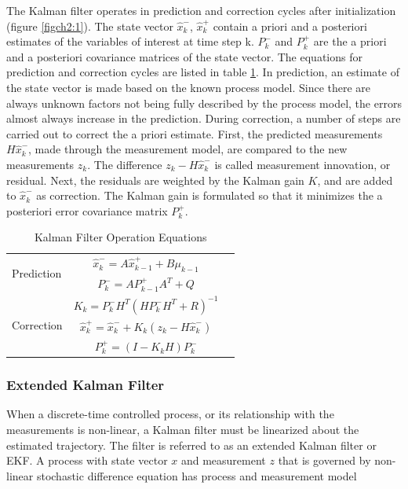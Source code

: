 The Kalman filter operates in prediction and correction cycles after
initialization (figure \ref{figch2:1}). The state vector
$\hat{x}^-_k$, $\hat{x}^+_k$ contain a priori and a posteriori
estimates of the variables of interest at time step k. $P^-_k$ and
$P^+_k$ are the a priori and a posteriori covariance matrices of the
state vector. The equations for prediction and correction cycles are
listed in table \ref{tab:KF}. In prediction, an estimate of the state
vector is made based on the known process model. Since there are
always unknown factors not being fully described by the process model,
the errors almost always increase in the prediction. During
correction, a number of steps are carried out to correct the a priori
estimate. First, the predicted measurements $H\hat{x}^-_k$, made
through the measurement model, are compared to the new measurements
$z_k$. The difference $z_k - H\hat{x}^-_k$ is called measurement
innovation, or residual. Next, the residuals are weighted by the
Kalman gain $K$, and are added to $\hat{x}^-_k$ as correction. The
Kalman gain is formulated so that it minimizes the a posteriori error
covariance matrix $P^+_k$.

\begin{table}
\caption{Kalman Filter Operation Equations}
\label{tab:KF}
\centering
\begin{tabular}{|l|c r|}
\hline
\multirow{2}{*}{Prediction} 
& $\hat{x}^-_k=A\hat{x}^+_{k-1}+B\mu_{k-1}$ & \stepcounter{equation}\thetag{\theequation}\\
& $P^-_k = AP^+_{k-1}A^T+Q$ & \stepcounter{equation}\thetag{\theequation}\\
\hline
\multirow{3}{*}{Correction}
& $K_k=P^-_kH^T(HP^-_kH^T+R)^{-1}$  & \stepcounter{equation}\thetag{\theequation}\\
& $\hat{x}^+_k = \hat{x}^-_k+K_k(z_k-H\hat{x}^-_k)$ & \stepcounter{equation}\thetag{\theequation}\\
& $P^+_k = (I-K_kH)P^-_k$ & \stepcounter{equation}\thetag{\theequation}\\
\hline
\end{tabular}
\end{table}
\FloatBarrier

\subsubsection{Extended Kalman Filter}
When a discrete-time controlled process, or its relationship with the
measurements is non-linear, a Kalman filter must be linearized about
the estimated trajectory. The filter is referred to as an extended
Kalman filter or EKF. A process with state vector $x$ and measurement
$z$ that is governed by non-linear stochastic difference equation has
process and measurement model

